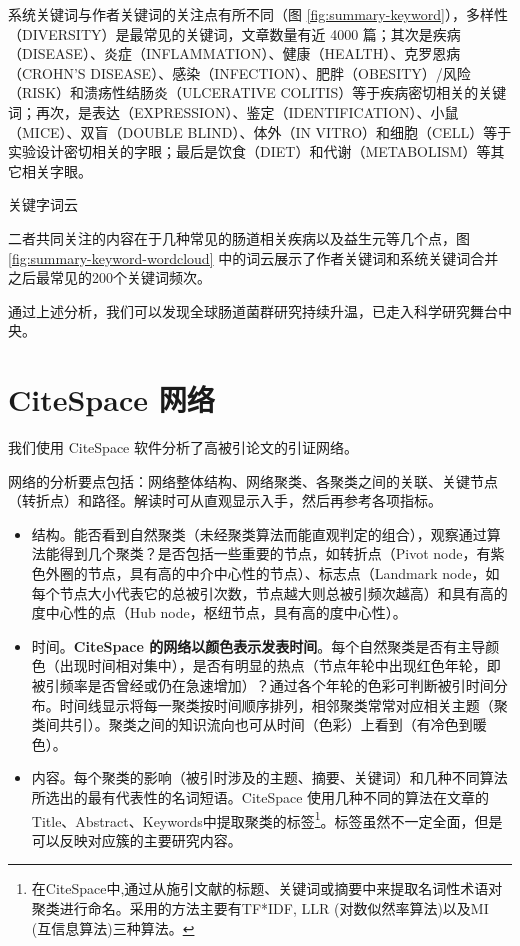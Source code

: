 \documentclass[]{ctexbook}
\begin{document}
系统关键词与作者关键词的关注点有所不同（图 \ref{fig:summary-keyword}），多样性（DIVERSITY）是最常见的关键词，文章数量有近 4000 篇；其次是疾病（DISEASE）、炎症（INFLAMMATION）、健康（HEALTH）、克罗恩病（CROHN'S DISEASE）、感染（INFECTION）、肥胖（OBESITY）/风险（RISK）和溃疡性结肠炎（ULCERATIVE COLITIS）等于疾病密切相关的关键词；再次，是表达（EXPRESSION）、鉴定（IDENTIFICATION）、小鼠（MICE）、双盲（DOUBLE BLIND）、体外（IN VITRO）和细胞（CELL）等于实验设计密切相关的字眼；最后是饮食（DIET）和代谢（METABOLISM）等其它相关字眼。

\hypertarget{htmlwidget-51517dbc7eb69e2e5079}{}

\label{fig:summary-keyword-wordcloud}关键字词云

二者共同关注的内容在于几种常见的肠道相关疾病以及益生元等几个点，图 \ref{fig:summary-keyword-wordcloud} 中的词云展示了作者关键词和系统关键词合并之后最常见的200个关键词频次。

通过上述分析，我们可以发现全球肠道菌群研究持续升温，已走入科学研究舞台中央。

\hypertarget{citespace-network}{%
\chapter{CiteSpace 网络}\label{citespace-network}}

我们使用 CiteSpace 软件\citep{chenCiteSpaceIIDetecting2006}分析了高被引论文的引证网络。

网络的分析要点包括：网络整体结构、网络聚类、各聚类之间的关联、关键节点（转折点）和路径。解读时可从直观显示入手，然后再参考各项指标。

\begin{itemize}
\item
  结构。能否看到自然聚类（未经聚类算法而能直观判定的组合），观察通过算法能得到几个聚类？是否包括一些重要的节点，如转折点（Pivot node，有紫色外圈的节点，具有高的中介中心性的节点）、标志点（Landmark node，如每个节点大小代表它的总被引次数，节点越大则总被引频次越高）和具有高的度中心性的点（Hub node，枢纽节点，具有高的度中心性）。
\item
  时间。\textbf{CiteSpace 的网络以颜色表示发表时间}。每个自然聚类是否有主导颜色（出现时间相对集中），是否有明显的热点（节点年轮中出现红色年轮，即被引频率是否曾经或仍在急速增加）？通过各个年轮的色彩可判断被引时间分布。时间线显示将每一聚类按时间顺序排列，相邻聚类常常对应相关主题（聚类间共引）。聚类之间的知识流向也可从时间（色彩）上看到（有冷色到暖色）。
\item
  内容。每个聚类的影响（被引时涉及的主题、摘要、关键词）和几种不同算法所选出的最有代表性的名词短语。CiteSpace 使用几种不同的算法在文章的 Title、Abstract、Keywords中提取聚类的标签\footnote{在CiteSpace中,通过从施引文献的标题、关键词或摘要中来提取名词性术语对聚类进行命名。采用的方法主要有TF*IDF, LLR (对数似然率算法)以及MI (互信息算法)三种算法。}。标签虽然不一定全面，但是可以反映对应簇的主要研究内容。
\end{itemize}
\end{document}
